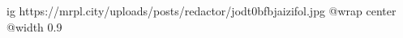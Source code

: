  
 
 
 
 

\ifcmt
  ig https://mrpl.city/uploads/posts/redactor/jodt0bfbjaizifol.jpg
  @wrap center
  @width 0.9
\fi
